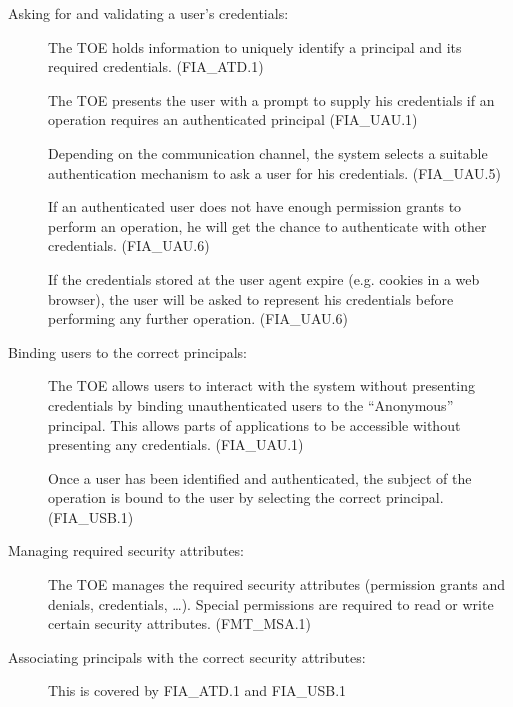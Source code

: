 \documentclass[12pt,english]{scrbook}
\begin{document}
    \begin{description}
        \item[Asking for and validating a user's credentials:]

            The TOE holds information to uniquely identify a principal and its
            required credentials. (FIA\_ATD.1) 
            
            The TOE presents the user with a prompt to supply his credentials
            if an operation requires an authenticated principal (FIA\_UAU.1)

            Depending on the communication channel, the system selects a
            suitable authentication mechanism to ask a user for his
            credentials. (FIA\_UAU.5)

            If an authenticated user does not have enough permission grants to
            perform an operation, he will get the chance to authenticate with
            other credentials. (FIA\_UAU.6)

            If the credentials stored at the user agent expire (e.g. cookies in
            a web browser), the user will be asked to represent his credentials
            before performing any further operation. (FIA\_UAU.6)

        \item[Binding users to the correct principals:]

            The TOE allows users to interact with the system without presenting
            credentials by binding unauthenticated users to the ``Anonymous''
            principal. This allows parts of applications to be accessible without
            presenting any credentials. (FIA\_UAU.1)

            Once a user has been identified and authenticated, the subject of
            the operation is bound to the user by selecting the correct
            principal. (FIA\_USB.1)

        \item[Managing required security attributes:]

            The TOE manages the required security attributes (permission grants
            and denials, credentials, \dots). Special permissions are required
            to read or write certain security attributes. (FMT\_MSA.1)

        \item[Associating principals with the correct security attributes:]

            This is covered by FIA\_ATD.1 and FIA\_USB.1

    \end{description}
\end{document}

